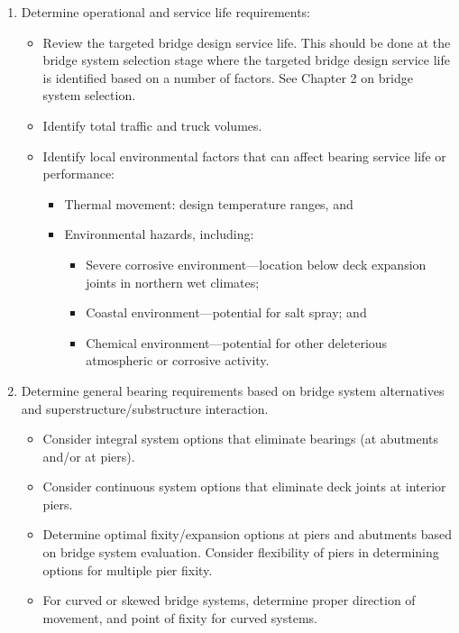 \begin{enumerate}[label=步骤 1.\arabic*,itemindent=4em]
  \item Determine operational and service life requirements:
  \begin{itemize}
    \item Review the targeted bridge design service life. This should be done at the bridge system selection stage where the targeted bridge design service life is identified based on a number of factors. See Chapter 2 on bridge system selection.
    \item Identify total traffic and truck volumes.
    \item Identify local environmental factors that can affect bearing service life or performance:
    \begin{itemize}
      \item Thermal movement: design temperature ranges, and
      \item Environmental hazards, including:
      \begin{itemize}
        \item Severe corrosive environment—location below deck expansion joints in northern wet climates;
        \item Coastal environment—potential for salt spray; and
        \item Chemical environment—potential for other deleterious atmospheric or corrosive
        activity.
      \end{itemize}
    \end{itemize}
  \end{itemize}
  \item Determine general bearing requirements based on bridge system alternatives and superstructure/substructure interaction.
  \begin{itemize}
    \item Consider integral system options that eliminate bearings (at abutments and/or at piers).
    \item Consider continuous system options that eliminate deck joints at interior piers.
    \item Determine optimal fixity/expansion options at piers and abutments based on bridge system evaluation. Consider flexibility of piers in determining options for multiple pier fixity.
    \item For curved or skewed bridge systems, determine proper direction of movement, and point of fixity for curved systems.
  \end{itemize}

\end{enumerate}
